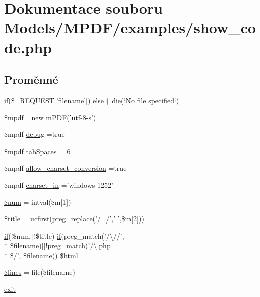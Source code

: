 \hypertarget{show__code_8php}{\section{Dokumentace souboru Models/\-M\-P\-D\-F/examples/show\-\_\-code.php}
\label{show__code_8php}
}
\subsection*{Proměnné}
\begin{DoxyCompactItemize}
\item 
\hyperlink{pdf__parser_8php_af8105e84b42a9ceda5357caeb6c4760b}{if}(\$\-\_\-\-R\-E\-Q\-U\-E\-S\-T\mbox{[}'filename'\mbox{]}) \hyperlink{show__code_8php_a3c8ec87efb7bfeaea8b9ec9c7c3ef10f}{else} \{ die(\char`\"{}No file specified\char`\"{})
\item 
\hyperlink{show__code_8php_ad028f81910d6cbab9b184d2214b3a8f8}{\$mpdf} =new \hyperlink{classm_p_d_f}{m\-P\-D\-F}('utf-\/8-\/s')
\item 
\$mpdf \hyperlink{show__code_8php_a200a436f1833a712239f1ae5bec608db}{debug} =true
\item 
\$mpdf \hyperlink{show__code_8php_ab4e4c4f5a4a02d8b15368b16f6a0d60c}{tab\-Spaces} = 6
\item 
\$mpdf \hyperlink{show__code_8php_abef25a78e171b6e37513665f692d1960}{allow\-\_\-charset\-\_\-conversion} =true
\item 
\$mpdf \hyperlink{show__code_8php_a2ee5c294694d309db57ff7d247030461}{charset\-\_\-in} ='windows-\/1252'
\item 
\hyperlink{show__code_8php_a606c9dff2aade84f01338c3c4cd8016b}{\$num} = intval(\$m\mbox{[}1\mbox{]})
\item 
\hyperlink{show__code_8php_ada57e7bb7c152edad18fe2f166188691}{\$title} = ucfirst(preg\-\_\-replace('/\-\_\-/',' ',\$m\mbox{[}2\mbox{]}))
\item 
\hyperlink{pdf__parser_8php_af8105e84b42a9ceda5357caeb6c4760b}{if}(!\$num$|$$|$!\$title) \hyperlink{pdf__parser_8php_af8105e84b42a9ceda5357caeb6c4760b}{if}(preg\-\_\-match('/\textbackslash{}//', \\*
\$filename)$|$$|$!preg\-\_\-match('/\textbackslash{}.php \\*
\$/', \$filename)) \hyperlink{show__code_8php_a6f96e7fc92441776c9d1cd3386663b40}{\$html}
\item 
\hyperlink{show__code_8php_a470f99c17f2e6f0a5a7b96f44cfc46a5}{\$lines} = file(\$filename)
\item 
\hyperlink{show__code_8php_a6733eb5f605d09eaede9845835d71c4e}{exit}
\end{DoxyCompactItemize}


